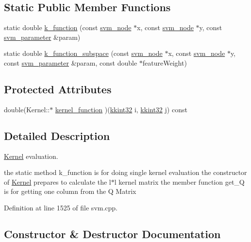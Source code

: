 \subsection*{Static Public Member Functions}
\begin{DoxyCompactItemize}
\item 
static double \hyperlink{class_s_v_m233_1_1_kernel_a195fb8072dd04596f56d6ee3edbb75c5}{k\+\_\+function} (const \hyperlink{struct_s_v_m233_1_1svm__node}{svm\+\_\+node} $\ast$x, const \hyperlink{struct_s_v_m233_1_1svm__node}{svm\+\_\+node} $\ast$y, const \hyperlink{struct_s_v_m233_1_1svm__parameter}{svm\+\_\+parameter} \&param)
\item 
static double \hyperlink{class_s_v_m233_1_1_kernel_a39cba4a10c3b72ba0cc45fc9d334e7ee}{k\+\_\+function\+\_\+subspace} (const \hyperlink{struct_s_v_m233_1_1svm__node}{svm\+\_\+node} $\ast$x, const \hyperlink{struct_s_v_m233_1_1svm__node}{svm\+\_\+node} $\ast$y, const \hyperlink{struct_s_v_m233_1_1svm__parameter}{svm\+\_\+parameter} \&param, const double $\ast$feature\+Weight)
\end{DoxyCompactItemize}
\subsection*{Protected Attributes}
\begin{DoxyCompactItemize}
\item 
double(Kernel\+::$\ast$ \hyperlink{class_s_v_m233_1_1_kernel_a0129d64ce9495829dfa1937c87ba2682}{kernel\+\_\+function} )(\hyperlink{namespace_k_k_b_a8fa4952cc84fda1de4bec1fbdd8d5b1b}{kkint32} i, \hyperlink{namespace_k_k_b_a8fa4952cc84fda1de4bec1fbdd8d5b1b}{kkint32} j) const 
\end{DoxyCompactItemize}


\subsection{Detailed Description}
\hyperlink{class_s_v_m233_1_1_kernel}{Kernel} evaluation. 

the static method k\+\_\+function is for doing single kernel evaluation the constructor of \hyperlink{class_s_v_m233_1_1_kernel}{Kernel} prepares to calculate the l$\ast$l kernel matrix the member function get\+\_\+Q is for getting one column from the Q Matrix 

Definition at line 1525 of file svm.\+cpp.



\subsection{Constructor \& Destructor Documentation}
